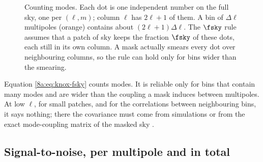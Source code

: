 \begin{figure}[htbp]
\centering
{}
\caption{Counting modes. Each dot is one independent number on the full sky, one per
$(\ell,m)$; column $\ell$ has $2\ell+1$ of them. A bin of $\Delta\ell$ multipoles (orange)
contains about $(2\ell+1)\Delta\ell$. The $\fsky$ rule assumes that a patch of sky keeps the
fraction $\fsky$ of these dots, each still in its own column. A mask actually smears every dot
over neighbouring columns, so the rule can hold only for bins wider than the smearing.}
\label{8a:fig:modes}
\end{figure}

\begin{pitfall}
Equation \eqref{8a:eq:knox-fsky} counts modes. It is reliable only for bins that contain many
modes and are wider than the coupling a mask induces between multipoles. At low $\ell$, for
small patches, and for the correlations between neighbouring bins, it says nothing; there the
covariance must come from simulations or from the exact mode-coupling matrix of the masked
sky .
\end{pitfall}

\subsection{Signal-to-noise, per multipole and in total}
\label{8a:sec:snr}

